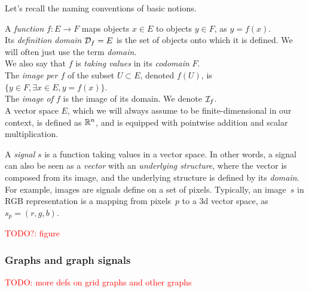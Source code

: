 Let's recall the naming conventions of basic notions.

A \emph{function} $f: E \rightarrow F$ maps objects $x \in E$ to objects $y \in F$, as $y = f(x)$.\\
Its \emph{definition domain} $\mathcal{D}_f = E$ is the set of objects onto which it is defined. We will often just use the term \emph{domain}.\\
We also say that $f$ is \emph{taking values} in its \emph{codomain} $F$.\\
The \emph{image per $f$} of the subset $U \subset E$, denoted $f(U)$, is $\{y \in F, \exists x \in E, y = f(x)\}$.\\
The \emph{image of $f$} is the image of its domain. We denote $\mathcal{I}_f$.\\
A vector space $E$, which we will always assume to be finite-dimensional in our context, is defined as $\mathbb{R}^n$, and is equipped with pointwise addition and scalar multiplication.%

A \emph{signal} $s$ is a function taking values in a vector space. In other words, a signal can also be seen as a \emph{vector} with an \emph{underlying structure}, where the vector is composed from its image, and the underlying structure is defined by its \emph{domain}.\\

For example, images are signals define on a set of pixels. Typically, an image~$s$ in RGB representation is a mapping from pixels~$p$ to a 3d vector space, as $s_p = (r,g,b)$.

\textcolor{red}{TODO?: figure}
\begin{figure}

\end{figure}

\subsubsection{Graphs and graph signals}

%
\textcolor{red}{TODO: more defs on grid graphs and other graphs}
%

